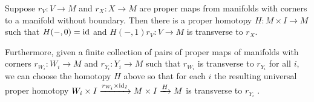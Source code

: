 \begin{proposition}\label{P: perturb transverse to map; pairs}
	Suppose $r_V \colon V \to M$ and $r_X \colon X \to M$ are proper maps from manifolds with corners to a manifold without boundary.
	Then there is a proper homotopy $H \colon M \times I \to M$ such that $H(-,0) = \mathrm{id}$ and $H(-,1)r_V \colon V \to M$ is transverse to $r_X$.

	Furthermore, given a finite collection of pairs of proper maps of manifolds with corners $r_{W_i} \colon W_i \to M$ and $r_{Y_i} \colon Y_i \to M$ such that $r_{W_i}$ is transverse to $r_{Y_i}$ for all $i$, we can choose the homotopy $H$ above so that for each $i$ the resulting universal proper homotopy $W_i \times I \xrightarrow{r_{W_i} \times \mathrm{id}_I} M \times I \xrightarrow{H} M$ is transverse to $r_{Y_i}$ .
\end{proposition}
